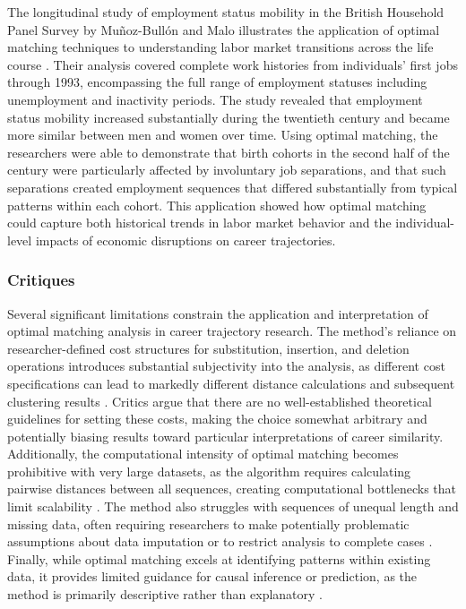 \documentclass[../main.tex]{subfiles}
\begin{document}
The longitudinal study of employment status mobility in the British Household Panel Survey by Muñoz-Bullón and Malo illustrates the application of optimal matching techniques to understanding labor market transitions across the life course \parencite{employment_status_mobility}. Their analysis covered complete work histories from individuals' first jobs through 1993, encompassing the full range of employment statuses including unemployment and inactivity periods. The study revealed that employment status mobility increased substantially during the twentieth century and became more similar between men and women over time. Using optimal matching, the researchers were able to demonstrate that birth cohorts in the second half of the century were particularly affected by involuntary job separations, and that such separations created employment sequences that differed substantially from typical patterns within each cohort. This application showed how optimal matching could capture both historical trends in labor market behavior and the individual-level impacts of economic disruptions on career trajectories.

\subsubsection{Critiques}

Several significant limitations constrain the application and interpretation of optimal matching analysis in career trajectory research. The method's reliance on researcher-defined cost structures for substitution, insertion, and deletion operations introduces substantial subjectivity into the analysis, as different cost specifications can lead to markedly different distance calculations and subsequent clustering results \parencite{second_wave_sequence_analysis}. Critics argue that there are no well-established theoretical guidelines for setting these costs, making the choice somewhat arbitrary and potentially biasing results toward particular interpretations of career similarity. Additionally, the computational intensity of optimal matching becomes prohibitive with very large datasets, as the algorithm requires calculating pairwise distances between all sequences, creating computational bottlenecks that limit scalability \parencite{sequence_analysis_social_science}. The method also struggles with sequences of unequal length and missing data, often requiring researchers to make potentially problematic assumptions about data imputation or to restrict analysis to complete cases \parencite{sequence_analysis_social_science}. Finally, while optimal matching excels at identifying patterns within existing data, it provides limited guidance for causal inference or prediction, as the method is primarily descriptive rather than explanatory \parencite{second_wave_sequence_analysis}.
\end{document}
